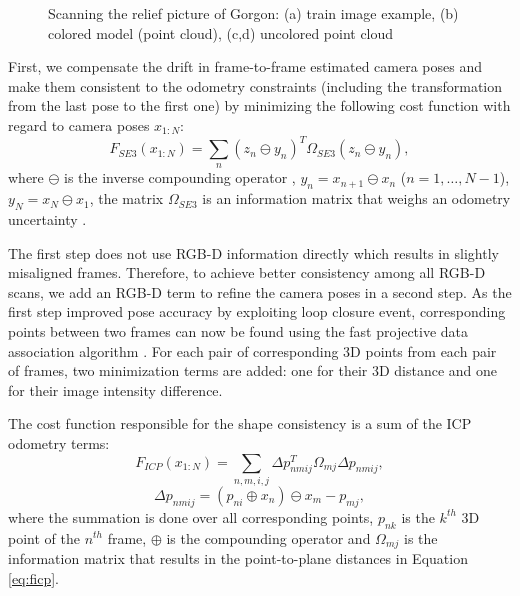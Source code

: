 \documentclass[letterpaper, 10 pt, conference]{ieeeconf}  %
\begin{document}
\begin{figure}[t]
\begin{subfigure}[b]{0.45\linewidth}
                \caption{}
        \end{subfigure}
        \caption{Scanning the relief picture of Gorgon: (a) train image example,
        (b) colored model (point cloud), (c,d) uncolored point cloud}
        \label{fig:gorgon}
\end{figure}

First, we compensate the drift in frame-to-frame estimated camera poses and 
make them consistent to the odometry constraints (including the transformation from the last pose
to the first one) by minimizing the following cost function
with regard to camera poses $x_{1:N}$:
\begin{equation} \label{eq:ffirst}
F_{SE3}(x_{1:N}) = \sum_n (z_n \ominus y_n)^T \Omega_{SE3} (z_n \ominus y_n),
\end{equation}
where $\ominus$ is the inverse compounding operator \cite{lu1997globally},
$y_n=x_{n+1} \ominus x_{n}$ ($n=1,\dots, N-1$), $y_N=x_N \ominus x_1$,
the matrix $\Omega_{SE3}$ is an information matrix that weighs an odometry uncertainty \cite{kuemmerle2011g2o}.

The first step does not use RGB-D information directly which results in
slightly misaligned frames. Therefore, to achieve better consistency among all RGB-D scans, we add an RGB-D term to 
refine the camera poses in a second step.
As the first step improved pose accuracy by exploiting loop closure event, 
corresponding points between two frames can now be found using
the fast projective data association algorithm \cite{rusinkiewicz2001efficient}.
For each pair of corresponding 3D points from each pair of frames, two minimization terms are added: one 
for their 3D distance and one for their image intensity difference.

The cost function responsible for the shape 
consistency is a sum of the ICP odometry terms:
\begin{equation} \label{eq:ficp}
    F_{ICP}(x_{1:N}) = \sum_{n,m,i,j} \Delta p_{nmij}^T \Omega_{mj} \Delta p_{nmij},
\end{equation}
\begin{equation}
    \Delta p_{nmij}=(p_{ni} \oplus x_n) \ominus x_m - p_{mj},
\end{equation}
where the summation is done over all corresponding points, $p_{nk}$ is the $k^{th}$ 3D point of 
the $n^{th}$ frame, $\oplus$ is 
the compounding operator \cite{lu1997globally} and $\Omega_{mj}$ is 
the information matrix that results in the point-to-plane 
distances in Equation \eqref{eq:ficp}.
\end{document}
